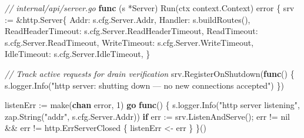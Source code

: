 \documentclass[
]{article}
\newenvironment{Shaded}{}{}
\newcommand{\BuiltInTok}[1]{\textcolor[rgb]{0.00,0.50,0.00}{#1}}
\newcommand{\CommentTok}[1]{\textcolor[rgb]{0.38,0.63,0.69}{\textit{#1}}}
\newcommand{\ControlFlowTok}[1]{\textcolor[rgb]{0.00,0.44,0.13}{\textbf{#1}}}
\newcommand{\DataTypeTok}[1]{\textcolor[rgb]{0.56,0.13,0.00}{#1}}
\newcommand{\DecValTok}[1]{\textcolor[rgb]{0.25,0.63,0.44}{#1}}
\newcommand{\KeywordTok}[1]{\textcolor[rgb]{0.00,0.44,0.13}{\textbf{#1}}}
\newcommand{\NormalTok}[1]{#1}
\newcommand{\OperatorTok}[1]{\textcolor[rgb]{0.40,0.40,0.40}{#1}}
\newcommand{\OtherTok}[1]{\textcolor[rgb]{0.00,0.44,0.13}{#1}}
\newcommand{\StringTok}[1]{\textcolor[rgb]{0.25,0.44,0.63}{#1}}
\begin{document}
\begin{Shaded}
\begin{Highlighting}[]
\CommentTok{// internal/api/server.go}
\KeywordTok{func} \OperatorTok{(}\NormalTok{s }\OperatorTok{*}\NormalTok{Server}\OperatorTok{)}\NormalTok{ Run}\OperatorTok{(}\NormalTok{ctx context}\OperatorTok{.}\NormalTok{Context}\OperatorTok{)} \DataTypeTok{error} \OperatorTok{\{}
\NormalTok{    srv }\OperatorTok{:=} \OperatorTok{\&}\NormalTok{http}\OperatorTok{.}\NormalTok{Server}\OperatorTok{\{}
\NormalTok{        Addr}\OperatorTok{:}\NormalTok{              s}\OperatorTok{.}\NormalTok{cfg}\OperatorTok{.}\NormalTok{Server}\OperatorTok{.}\NormalTok{Addr}\OperatorTok{,}
\NormalTok{        Handler}\OperatorTok{:}\NormalTok{           s}\OperatorTok{.}\NormalTok{buildRoutes}\OperatorTok{(),}
\NormalTok{        ReadHeaderTimeout}\OperatorTok{:}\NormalTok{ s}\OperatorTok{.}\NormalTok{cfg}\OperatorTok{.}\NormalTok{Server}\OperatorTok{.}\NormalTok{ReadHeaderTimeout}\OperatorTok{,}
\NormalTok{        ReadTimeout}\OperatorTok{:}\NormalTok{       s}\OperatorTok{.}\NormalTok{cfg}\OperatorTok{.}\NormalTok{Server}\OperatorTok{.}\NormalTok{ReadTimeout}\OperatorTok{,}
\NormalTok{        WriteTimeout}\OperatorTok{:}\NormalTok{      s}\OperatorTok{.}\NormalTok{cfg}\OperatorTok{.}\NormalTok{Server}\OperatorTok{.}\NormalTok{WriteTimeout}\OperatorTok{,}
\NormalTok{        IdleTimeout}\OperatorTok{:}\NormalTok{       s}\OperatorTok{.}\NormalTok{cfg}\OperatorTok{.}\NormalTok{Server}\OperatorTok{.}\NormalTok{IdleTimeout}\OperatorTok{,}
    \OperatorTok{\}}

    \CommentTok{// Track active requests for drain verification}
\NormalTok{    srv}\OperatorTok{.}\NormalTok{RegisterOnShutdown}\OperatorTok{(}\KeywordTok{func}\OperatorTok{()} \OperatorTok{\{}
\NormalTok{        s}\OperatorTok{.}\NormalTok{logger}\OperatorTok{.}\NormalTok{Info}\OperatorTok{(}\StringTok{"http server: shutting down — no new connections accepted"}\OperatorTok{)}
    \OperatorTok{\})}

\NormalTok{    listenErr }\OperatorTok{:=} \BuiltInTok{make}\OperatorTok{(}\KeywordTok{chan} \DataTypeTok{error}\OperatorTok{,} \DecValTok{1}\OperatorTok{)}
    \ControlFlowTok{go} \KeywordTok{func}\OperatorTok{()} \OperatorTok{\{}
\NormalTok{        s}\OperatorTok{.}\NormalTok{logger}\OperatorTok{.}\NormalTok{Info}\OperatorTok{(}\StringTok{"http server listening"}\OperatorTok{,}\NormalTok{ zap}\OperatorTok{.}\NormalTok{String}\OperatorTok{(}\StringTok{"addr"}\OperatorTok{,}\NormalTok{ s}\OperatorTok{.}\NormalTok{cfg}\OperatorTok{.}\NormalTok{Server}\OperatorTok{.}\NormalTok{Addr}\OperatorTok{))}
        \ControlFlowTok{if}\NormalTok{ err }\OperatorTok{:=}\NormalTok{ srv}\OperatorTok{.}\NormalTok{ListenAndServe}\OperatorTok{();}\NormalTok{ err }\OperatorTok{!=} \OtherTok{nil} \OperatorTok{\&\&}\NormalTok{ err }\OperatorTok{!=}\NormalTok{ http}\OperatorTok{.}\NormalTok{ErrServerClosed }\OperatorTok{\{}
\NormalTok{            listenErr }\OperatorTok{\textless{}{-}}\NormalTok{ err}
        \OperatorTok{\}}
    \OperatorTok{\}()}


\end{Highlighting}
\end{Shaded}
\end{document}
